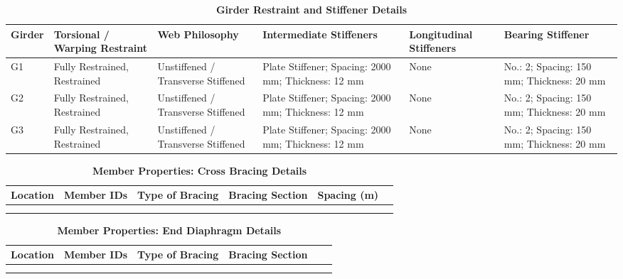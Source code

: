 \documentclass[12pt,a4paper]{report}
\numberwithin{table}{chapter}
\numberwithin{figure}{chapter}
\begin{document}
\vspace{4pt}
\begin{longtable}{|L{1.4cm}|p{2.2cm}|p{2.2cm}|p{3.0cm}|p{2.4cm}|p{2.2cm}|}
\caption{\textbf{Girder Restraint and Stiffener Details}}\\
\hline
\textbf{Girder} & \textbf{Torsional / Warping Restraint} & \textbf{Web Philosophy} & \textbf{Intermediate Stiffeners} & \textbf{Longitudinal Stiffeners} & \textbf{Bearing Stiffener} \\[6pt]
\hline
\endfirsthead
\endhead

G1 & Fully Restrained, Restrained & Unstiffened / Transverse Stiffened & Plate Stiffener; Spacing: 2000 mm; Thickness: 12 mm & None & No.: 2; Spacing: 150 mm; Thickness: 20 mm \\[8pt]
\hline
G2 & Fully Restrained, Restrained & Unstiffened / Transverse Stiffened & Plate Stiffener; Spacing: 2000 mm; Thickness: 12 mm & None & No.: 2; Spacing: 150 mm; Thickness: 20 mm \\[8pt]
\hline
G3 & Fully Restrained, Restrained & Unstiffened / Transverse Stiffened & Plate Stiffener; Spacing: 2000 mm; Thickness: 12 mm & None & No.: 2; Spacing: 150 mm; Thickness: 20 mm \\[8pt]
\hline
\end{longtable}



\newpage

\vspace{0.4em}
\setlength{\tabcolsep}{4pt}
\setlength\LTleft{0pt}
\setlength\LTright{\fill}

\begin{longtable}{|L{2.2cm}|L{2.2cm}|L{3.0cm}|L{2.5cm}|C{1.8cm}|C{1.8cm}|}
\caption{\textbf{Member Properties: Cross Bracing Details}}
\hline
\textbf{Location} & \textbf{Member IDs} & \textbf{Type of Bracing} & \textbf{Bracing Section} & \textbf{Spacing (m)} \\
\hline
 &  &  &  &  \\[6pt]
\hline
 &  &  &  &  \\[6pt]
\hline
\end{longtable}

\vspace{0.4em}
\noindent
\setlength{\tabcolsep}{4pt}
\setlength\LTleft{0pt}
\setlength\LTright{\fill}

\begin{longtable}{|L{2.2cm}|L{2.2cm}|L{3.0cm}|L{2.5cm}|C{1.8cm}|C{1.8cm}|}
\caption{\textbf{Member Properties: End Diaphragm Details}}
\hline
\textbf{Location} & \textbf{Member IDs} & \textbf{Type of Bracing} & \textbf{Bracing Section} \\
\hline
 &  &  &  \\[6pt]
\hline
 &  &  &  \\[6pt]
\hline
\end{longtable}
\end{document}
